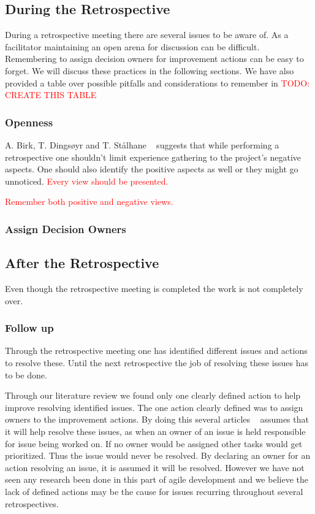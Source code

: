 \documentclass[12pt]{article}
\newcommand\todo[1]{\textcolor{red}{#1}}
\begin{document}
\subsection{During the Retrospective}
During a retrospective meeting there are several issues to be aware of. As a facilitator maintaining an open arena for discussion can be difficult. Remembering to assign decision owners for improvement actions can be easy to forget. We will discuss these practices in the following sections. We have also provided a table over possible pitfalls and considerations to remember in \todo{TODO: CREATE THIS TABLE}

\subsubsection{Openness}
A. Birk, T. Dingsøyr and T. Stålhane ~\cite{Birk2002} suggests that while performing a retrospective one shouldn't limit experience gathering to the project's negative aspects. One should also identify the positive aspects as well or they might go unnoticed. 
\todo{Every view should be presented.}

\todo{Remember both positive and negative views.}

\subsubsection{Assign Decision Owners} \label{par:assign-decision-owners}

\subsection{After the Retrospective}
Even though the retrospective meeting is completed the work is not completely over. 

\subsubsection{Follow up}
Through the retrospective meeting one has identified different issues and actions to resolve these. Until the next retrospective the job of resolving these issues has to be done. 

Through our literature review we found only one clearly defined action to help improve resolving identified issues. The one action clearly defined was to assign owners to the improvement actions. By doing this several articles ~\cite{Collier1996,Drury2012} assumes that it will help resolve these issues, as when an owner of an issue is held responsible for issue being worked on. If no owner would be assigned other tasks would get prioritized. Thus the issue would never be resolved. By declaring an owner for an action resolving an issue, it is assumed it will be resolved. However we have not seen any research been done in this part of agile development and we believe the lack of defined actions may be the cause for issues recurring throughout several retrospectives. 
\end{document}
